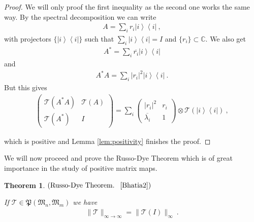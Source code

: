 \documentclass[a4paper
               ,12pt
               ,DIV=12
               ,oneside
               ]
               {amsart}
\theoremstyle{plain}
\newtheorem{thm}{Theorem}
\theoremstyle{remark}
\def\ra{\rightarrow}
\def\lb{\left(}
\def\rb{\right)}
\def\lset{\lbrace}
\def\rset{\rbrace}
\def\lk{\left\langle}
\def\rk{\right\rangle}
\def\l|{\left|}
\def\r|{\right|}
\newcommand\C{\mathbb{C}}
\newcommand\M{\mathfrak{M}}
\newcommand{\Tm}{\mathcal{T}}
\begin{document}
\begin{proof}

We will only proof the first inequality as the second one works the same way. By the spectral decomposition we can write 
\begin{align*}
A=\sum_i r_i \l| i\rk\lk i\r|\medspace,
\end{align*}
with projectors $\lset \l| i\rk\lk i\r|\rset$ such that $\sum_i \l| i\rk\lk i\r| = I$ and $\lset r_i\rset\subset\C$. 
We also get 
\begin{align*}
A^{*}=\sum_i \overline{r_i} \l| i\rk\lk i\r|
\end{align*}
and
\begin{align*}
A^{*}A=\sum_i \l|r_i\r|^2 \l| i\rk\lk i\r|\medspace.
\end{align*}
But this gives 
\begin{align*}
\begin{pmatrix} \Tm\lb A^{*}A\rb & \Tm\lb A\rb \\ \Tm\lb A^{*}\rb & I \end{pmatrix} = \sum_i \begin{pmatrix} \l|r_i\r|^2 & r_i \\ \overline{\lambda_i} & 1 \end{pmatrix}\otimes \Tm\lb\l|i\rk\lk i\r|\rb\medspace,
\end{align*}
 
which is positive and Lemma \ref{lem:positivity} finishes the proof.  

\end{proof}

We will now proceed and prove the Russo-Dye Theorem which is of great importance in the study of positive matrix maps. 

\begin{thm}$\lb\text{Russo-Dye Theorem. ~\cite{Bhatia2}}\rb$

If $\Tm\in\mathfrak{P}\lb \M_n,\M_m\rb$ we have
\begin{align*}
\| \Tm\|_{\infty\ra\infty} = \| \Tm\lb I\rb\|_\infty\medspace.
\end{align*}
\label{thm:RussoDye}
\end{thm}
\end{document}
